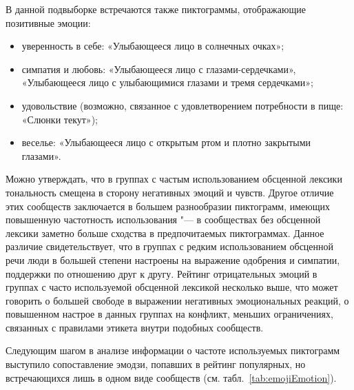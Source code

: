 В данной подвыборке встречаются также пиктограммы, отображающие позитивные эмоции:
\begin{itemize}
	\item уверенность в себе: «Улыбающееся лицо в солнечных очках»; 
	\item симпатия и любовь: «Улыбающееся лицо с глазами-сердечками», «Улыбающееся лицо с улыбающимися глазами и тремя сердечками»;
	\item удовольствие (возможно, связанное с удовлетворением потребности в пище: «Слюнки текут»); 
	\item веселье: «Улыбающееся лицо с открытым ртом и плотно закрытыми глазами».
\end{itemize}

Можно утверждать, что в группах с частым использованием обсценной лексики тональность смещена в сторону негативных эмоций и чувств. Другое отличие этих сообществ заключается в большем разнообразии пиктограмм, имеющих повышенную частотность использования "--- в сообществах без обсценной лексики заметно больше сходства в предпочитаемых пиктограммах. Данное различие свидетельствует, что в группах с редким использованием обсценной речи люди в большей степени настроены на выражение одобрения и симпатии, поддержки по отношению друг к другу. Рейтинг отрицательных эмоций в группах с часто используемой обсценной лексикой несколько выше, что может говорить о большей свободе в выражении негативных эмоциональных реакций, о повышенном настрое в данных группах на конфликт, меньших ограничениях, связанных с правилами этикета внутри подобных сообществ. 

Следующим шагом в анализе информации о частоте используемых пиктограмм выступило сопоставление эмодзи, попавших в рейтинг популярных, но встречающихся лишь в одном виде сообществ (см. табл.~\cref{tab:emojiEmotion}). 


